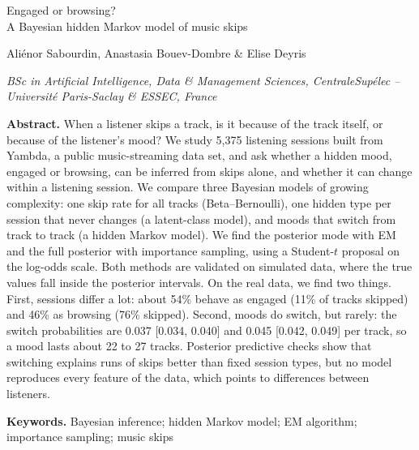 \documentclass[12pt]{article}
\begin{document}

\begin{center}
{\Large\sc Engaged or browsing?}\\[0.6em]
{\large\sc A Bayesian hidden Markov model of music skips}
\bigskip

Aliénor Sabourdin, Anastasia Bouev-Dombre \& Elise Deyris
\bigskip

{\it
BSc in Artificial Intelligence, Data \& Management Sciences, CentraleSupélec -- Université Paris-Saclay \& ESSEC, France
}
\end{center}

\bigskip

{\bf Abstract.} When a listener skips a track, is it because of the track itself, or because of the listener's mood? We study 5{,}375 listening sessions built from Yambda, a public music-streaming data set, and ask whether a hidden mood, engaged or browsing, can be inferred from skips alone, and whether it can change within a listening session. We compare three Bayesian models of growing complexity: one skip rate for all tracks (Beta--Bernoulli), one hidden type per session that never changes (a latent-class model), and moods that switch from track to track (a hidden Markov model). We find the posterior mode with EM and the full posterior with importance sampling, using a Student-$t$ proposal on the log-odds scale. Both methods are validated on simulated data, where the true values fall inside the posterior intervals. On the real data, we find two things. First, sessions differ a lot: about 54\% behave as engaged (11\% of tracks skipped) and 46\% as browsing (76\% skipped). Second, moods do switch, but rarely: the switch probabilities are 0.037 [0.034, 0.040] and 0.045 [0.042, 0.049] per track, so a mood lasts about 22 to 27 tracks. Posterior predictive checks show that switching explains runs of skips better than fixed session types, but no model reproduces every feature of the data, which points to differences between listeners.

{\bf Keywords.} Bayesian inference; hidden Markov model; EM algorithm; importance sampling; music skips
\bigskip\bigskip

\end{document}
